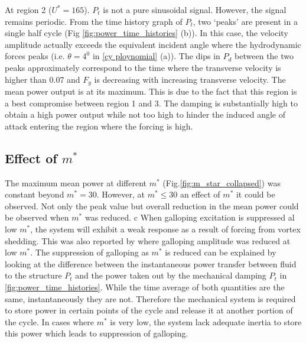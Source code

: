At region 2 ($U^*=165$). $P_t$ is not a pure sinusoidal signal. However, the  signal remains periodic. From the time history graph of $P_t$, two `peaks' are present in a single half cycle (Fig \ref{fig:power_time_histories} (b)). In this case, the velocity amplitude actually exceeds the equivalent incident angle where the hydrodynamic forces peaks (i.e. $\theta=4^0$ in \ref{cy ploynomial} (a)). The dips in $P_d$ between the two peaks approximately correspond to the time where the transverse velocity is higher than 0.07 and $F_y$ is decreasing with increasing transverse velocity. The mean power output is at its maximum. This is due to the fact that this region is a best compromise between region 1 and 3. The damping is substantially high to obtain a high power output while not too high to hinder the induced angle of attack entering the region where the forcing is high. 


 
  

 



\subsection{Effect of $m^*$}

 

The maximum mean power at different $m^*$ (Fig.\ref{fig:m_star_collapsed}) was constant beyond $m^*=30$. However, at $m^* \leq 30$ an effect of $m^*$ it could be observed. Not only the peak value but overall reduction in the mean power could be observed when $m^*$ was reduced. c When galloping excitation is suppressed al low $m^*$, the system will exhibit a weak response as a result of forcing from vortex shedding. This was also reported by \cite{Joly2012} where galloping amplitude was reduced at low $m^*$. The suppression of galloping as $m^*$ is reduced can be explained by looking at the difference between the instantaneous power transfer between fluid to the structure $P_t$ and the power taken out by the mechanical damping $P_t$ in \ref{fig:power_time_histories}. While the time average of both quantities are the same, instantaneously they are not. Therefore the mechanical system is required to store power in certain points of the cycle and release it at another portion of the cycle. In cases where $m^*$ is very low, the system lack adequate inertia to store this power which leads to suppression of galloping. 

 

